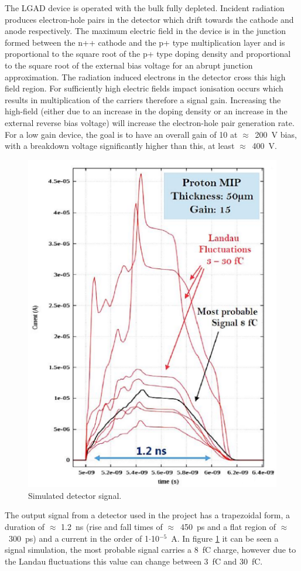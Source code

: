 \noindent The LGAD device is operated with the bulk fully depleted. Incident radiation produces electron-hole
pairs in the detector which drift towards the cathode and anode respectively. The maximum
electric field in the device is in the junction formed between the n++ cathode and the p+ type multiplication layer and is
proportional to the square root of the p+ type doping density and proportional to the square root of the
external bias voltage for an abrupt junction approximation.
The radiation induced electrons in the detector cross this high field region. For sufficiently
high electric fields impact ionisation occurs which results in multiplication of the carriers therefore a signal gain.
Increasing the high-field (either due to an increase in the doping density or
an increase in the external reverse bias voltage) will increase the electron-hole pair generation rate. For a
low gain device, the goal is to have an overall gain of 10 at $\approx$~200~V bias, with a breakdown voltage
significantly higher than this, at least $\approx$~400~V.
\begin{figure}[H]
	\centering
	\includegraphics[width=0.42\linewidth]{IMG/ch2/LGAD_Signal}
	\caption{Simulated detector signal\cite{dac}.}
	\label{fig:signal}
\end{figure}
\noindent The output signal from a detector used in the project has a trapezoidal form, a duration of $\approx$ 1.2~ns (rise and fall times of $\approx$~450~ps and a  flat region of $\approx$~300~ps) and a current in the order of 1$\cdot$10$^{-5}$~A.
In figure \ref{fig:signal} it can be seen a signal simulation, the most probable signal carries a 8~fC charge, however due to the Landau fluctuations this value can change between 3~fC and 30~fC.
